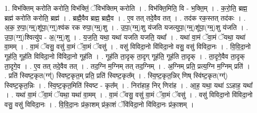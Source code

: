 \documentclass[17pt]{extarticle}
\begin{document}
1. विभ॑क्तिम् करोति करोति॒ विभ॑क्तिं॒ ॅविभ॑क्तिम् करोति । . विभ॑क्ति॒मिति॒ वि - भ॒क्ति॒म् । . क॒रो॒ति॒ ब्रह्म॒ ब्रह्म॑ करोति करोति॒ ब्रह्म॑ । . ब्रह्मै॒वैव ब्रह्म॒ ब्रह्मै॒व । . ए॒व तत् तदे॒वैव तत् । . तद॑क रक॒स्तत् तद॑कः । . अ॒क॒ रु॒पा॒(ग्म्॒)शू॑पा॒(ग्ग्॒)श्व॑क रक रुपा॒(ग्म्॒)शु । . उ॒पा॒(ग्म्॒)शु य॑जति यजत्युपा॒(ग्म्॒)शू॑पा॒(ग्म्॒)शु य॑जति । . उ॒पा॒(ग्ग्॒)श्वित्यु॑प - अ॒(ग्म्॒)शु । . य॒ज॒ति॒ यथा॒ यथा॑ यजति यजति॒ यथा᳚ । . यथा॑ वा॒मं ॅवा॒मं ॅयथा॒ यथा॑ वा॒मम् । . वा॒मं ॅवसु॒ वसु॑ वा॒मं ॅवा॒मं ॅवसु॑ । . वसु॑ विविदा॒नो वि॑विदा॒नो वसु॒ वसु॑ विविदा॒नः । . वि॒वि॒दा॒नो गूह॑ति॒ गूह॑ति विविदा॒नो वि॑विदा॒नो गूह॑ति । . गूह॑ति ता॒दृक् ता॒दृग् गूह॑ति॒ गूह॑ति ता॒दृक् । . ता॒दृगे॒वैव ता॒दृक् ता॒दृगे॒व । . ए॒व तत् तदे॒वैव तत् । . तद॒ग्नि म॒ग्निम् तत् तद॒ग्निम् । . अ॒ग्निम् प्रति॒ प्रत्य॒ग्नि म॒ग्निम् प्रति॑ । . प्रति॑ स्विष्ट॒कृत(ग्ग्॑) स्विष्ट॒कृत॒म् प्रति॒ प्रति॑ स्विष्ट॒कृत᳚म् । . स्वि॒ष्ट॒कृत॒न्निर् णिष् स्वि॑ष्ट॒कृत(ग्ग्॑) स्विष्ट॒कृत॒न्निः । . स्वि॒ष्ट॒कृत॒मिति॑ स्विष्ट - कृत᳚म् । . निरा॑हाह॒ निर् णिरा॑ह । . आ॒ह॒ यथा॒ यथा॑ ऽऽहाह॒ यथा᳚ । . यथा॑ वा॒मं ॅवा॒मं ॅयथा॒ यथा॑ वा॒मम् । . वा॒मं ॅवसु॒ वसु॑ वा॒मं ॅवा॒मं ॅवसु॑ । . वसु॑ विविदा॒नो वि॑विदा॒नो वसु॒ वसु॑ विविदा॒नः । . वि॒वि॒दा॒नः प्र॑का॒शम् प्र॑का॒शं ॅवि॑विदा॒नो वि॑विदा॒नः प्र॑का॒शम् । \newline
\end{document}
